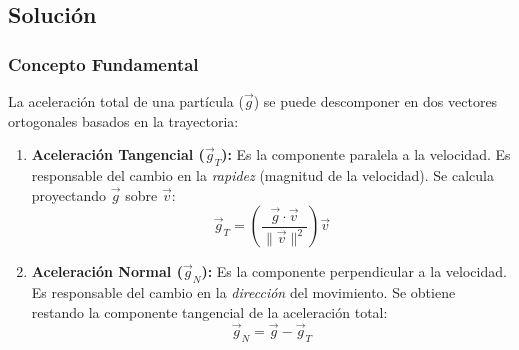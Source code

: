 \documentclass[12pt, a4paper]{article}
\begin{document}
\begin{center}
\end{center}

\subsection*{Solución}

\subsubsection*{Concepto Fundamental}
La aceleración total de una partícula ($\vec{g}$) se puede descomponer en dos vectores ortogonales basados en la trayectoria:
\begin{enumerate}
    \item \textbf{Aceleración Tangencial ($\vec{g}_T$):} Es la componente paralela a la velocidad. Es responsable del cambio en la \textit{rapidez} (magnitud de la velocidad). Se calcula proyectando $\vec{g}$ sobre $\vec{v}$:
    \begin{equation}
    \vec{g}_T = \left( \frac{\vec{g} \cdot \vec{v}}{\|\vec{v}\|^2} \right) \vec{v}
    \end{equation}
    \item \textbf{Aceleración Normal ($\vec{g}_N$):} Es la componente perpendicular a la velocidad. Es responsable del cambio en la \textit{dirección} del movimiento. Se obtiene restando la componente tangencial de la aceleración total:
    \begin{equation}
    \vec{g}_N = \vec{g} - \vec{g}_T
    \end{equation}
\end{enumerate}
\end{document}
